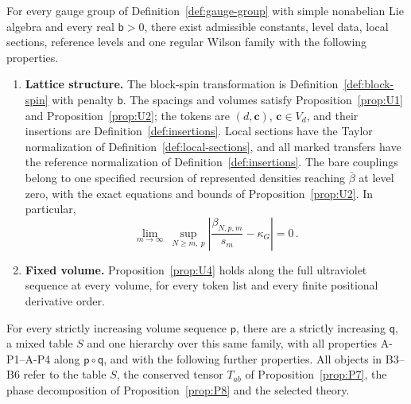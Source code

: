 \begin{theorem}\label{thm:B}
For every gauge group of Definition~\ref{def:gauge-group} with simple nonabelian Lie algebra and every real $\mathsf b>0$, there exist admissible constants, level data, local sections, reference levels and one regular Wilson family with the following properties.

\begin{enumerate}[label=\textup{B\arabic*.},leftmargin=2.7em,itemsep=0.35em,topsep=0.35em]
\item \textup{\textbf{Lattice structure.}} The block-spin transformation is Definition~\ref{def:block-spin} with penalty $\mathsf b$. The spacings and volumes satisfy Proposition~\ref{prop:U1} and Proposition~\ref{prop:U2}; the tokens are $(d,\mathbf c)$, $\mathbf c\in V_d$, and their insertions are Definition~\ref{def:insertions}. Local sections have the Taylor normalization of Definition~\ref{def:local-sections}, and all marked transfers have the reference normalization of Definition~\ref{def:insertions}. The bare couplings belong to one specified recursion of represented densities reaching $\bar\beta$ at level zero, with the exact equations and bounds of Proposition~\ref{prop:U2}. In particular,
\begin{equation}\label{eq:running-slope}
\lim_{m\to\infty}\ \sup_{N\ge m,\ p}\left|\frac{\beta_{N,p,m}}{s_m}-\kappa_G\right|=0\,.
\end{equation}

\item \textup{\textbf{Fixed volume.}} Proposition~\ref{prop:U4} holds along the full ultraviolet sequence at every volume, for every token list and every finite positional derivative order.

\end{enumerate}

For every strictly increasing volume sequence $\mathsf p$, there are a strictly increasing $\mathsf q$, a mixed table $S$ and one hierarchy over this same family, with all properties A-P1–A-P4 along $\mathsf p\circ\mathsf q$, and with the following further properties. All objects in B3–B6 refer to the table $S$, the conserved tensor $T_{ab}$ of Proposition~\ref{prop:P7}, the phase decomposition of Proposition~\ref{prop:P8} and the selected theory.


\end{theorem}
